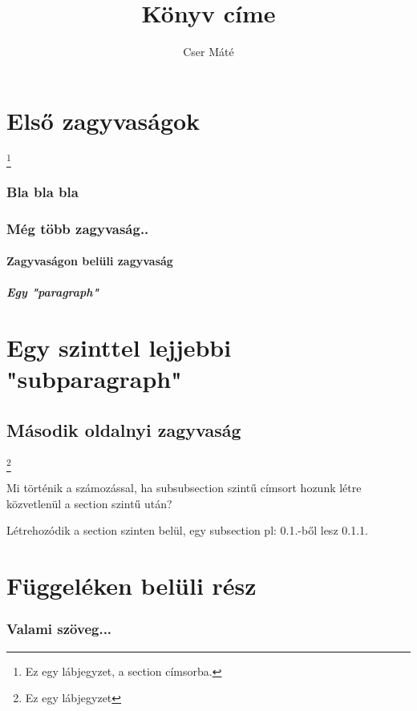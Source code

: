 \documentclass[12pt]{book}
\begin{document}
\title{Könyv címe}
\author{Cser Máté}
\maketitle

\tableofcontents
\newpage

\chapter[zagyvaság]{Első zagyvaságok}
\footnote{Ez egy lábjegyzet, a section címsorba.}
\subsection{Bla bla bla}
\hulipsum[2]  %
\subsection{Még több zagyvaság..}
\hulipsum[2]
\subsubsection{Zagyvaságon belüli zagyvaság}
\paragraph{Egy "paragraph"}
\chapter{Egy szinttel lejjebbi "subparagraph"}
\section{Második oldalnyi zagyvaság}
\hulipsum[2-3] \linebreak
\footnote{Ez egy lábjegyzet}

{
Mi történik a számozással, ha subsubsection szintű címsort hozunk létre
közvetlenül a section szintű után? \par
Létrehozódik a section szinten belül, egy subsection pl: 0.1.-ből lesz 0.1.1.
}

\appendix  %
\chapter{Függeléken belüli rész}
\subsection{Valami szöveg...}
\end{document}
